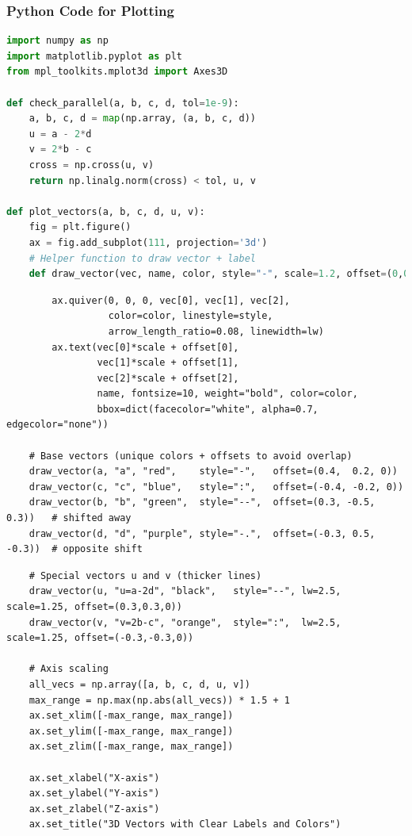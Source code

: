 \documentclass{beamer}
\theoremstyle{remark}
\numberwithin{equation}{section}
\begin{document}
\begin{frame}[fragile]
\frametitle{Python Code for Plotting}
\begin{lstlisting}[language=Python]
import numpy as np
import matplotlib.pyplot as plt
from mpl_toolkits.mplot3d import Axes3D

def check_parallel(a, b, c, d, tol=1e-9):
    a, b, c, d = map(np.array, (a, b, c, d))
    u = a - 2*d
    v = 2*b - c
    cross = np.cross(u, v)
    return np.linalg.norm(cross) < tol, u, v

def plot_vectors(a, b, c, d, u, v):
    fig = plt.figure()
    ax = fig.add_subplot(111, projection='3d')
    # Helper function to draw vector + label
    def draw_vector(vec, name, color, style="-", scale=1.2, offset=(0,0,0), lw=2.0):
    \end{lstlisting}
    \end{frame}
    \begin{frame}[fragile]
    \begin{lstlisting}
        ax.quiver(0, 0, 0, vec[0], vec[1], vec[2],
                  color=color, linestyle=style,
                  arrow_length_ratio=0.08, linewidth=lw)
        ax.text(vec[0]*scale + offset[0],
                vec[1]*scale + offset[1],
                vec[2]*scale + offset[2],
                name, fontsize=10, weight="bold", color=color,
                bbox=dict(facecolor="white", alpha=0.7, edgecolor="none"))

    # Base vectors (unique colors + offsets to avoid overlap)
    draw_vector(a, "a", "red",    style="-",   offset=(0.4,  0.2, 0))
    draw_vector(c, "c", "blue",   style=":",   offset=(-0.4, -0.2, 0))
    draw_vector(b, "b", "green",  style="--",  offset=(0.3, -0.5, 0.3))   # shifted away
    draw_vector(d, "d", "purple", style="-.",  offset=(-0.3, 0.5, -0.3))  # opposite shift
\end{lstlisting}
\end{frame}
\begin{frame}[fragile]
\begin{lstlisting}
    # Special vectors u and v (thicker lines)
    draw_vector(u, "u=a-2d", "black",   style="--", lw=2.5, scale=1.25, offset=(0.3,0.3,0))
    draw_vector(v, "v=2b-c", "orange",  style=":",  lw=2.5, scale=1.25, offset=(-0.3,-0.3,0))

    # Axis scaling
    all_vecs = np.array([a, b, c, d, u, v])
    max_range = np.max(np.abs(all_vecs)) * 1.5 + 1
    ax.set_xlim([-max_range, max_range])
    ax.set_ylim([-max_range, max_range])
    ax.set_zlim([-max_range, max_range])

    ax.set_xlabel("X-axis")
    ax.set_ylabel("Y-axis")
    ax.set_zlabel("Z-axis")
    ax.set_title("3D Vectors with Clear Labels and Colors")
\end{lstlisting}
\end{frame}
\end{document}
